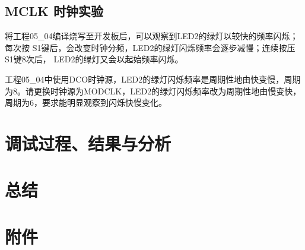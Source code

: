 \documentclass[a4paper,10pt,UTF8]{paper}
\numberwithin{equation}{section}
\numberwithin{figure}{section}
\begin{document}
\subsection{MCLK 时钟实验}

将工程05\_04编译烧写至开发板后，可以观察到LED2的绿灯以较快的频率闪烁；每次按 S1键后，会改变时钟分频，LED2的绿灯闪烁频率会逐步减慢；连续按压S1键8次后， LED2的绿灯又会以起始频率闪烁。

工程05\_04中使用DCO时钟源，LED2的绿灯闪烁频率是周期性地由快变慢，周期为8。请更换时钟源为MODCLK，LED2的绿灯闪烁频率改为周期性地由慢变快，周期为6，要求能明显观察到闪烁快慢变化。


\section{调试过程、结果与分析}

\section{总结}

\section{附件}
\end{document}
